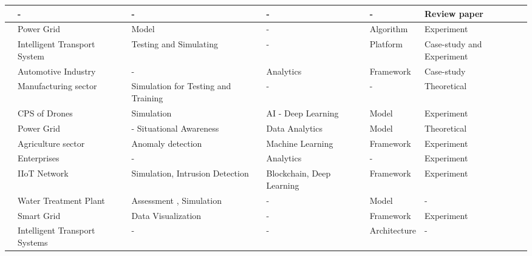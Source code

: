 \begin{table}[H]
\begin{NiceTabular}{p{0.5cm}|p{3cm}|p{2.5cm}|p{2cm}|p{3cm}|p{1.5cm}}
   \cite{rajivfaleiroDigitalTwinCybersecurity2022} & - & - & - & - & Review paper \\
   \hline

   \cite{hossenDigitalTwinSelfSecurity2021} & Power Grid & Model & - & Algorithm & Experiment \\
   \hline

   \cite{luongnguyenDigitalTwinIoT2022} & Intelligent Transport System & Testing and Simulating & - & Platform & Case-study and Experiment \\
    \hline

    \cite{almeaibedDigitalTwinAnalysis2021} & Automotive Industry & - & Analytics & Framework & Case-study \\
    \hline

    \cite{becueCyberFactorySecuringIndustry40with2018} & Manufacturing sector & Simulation for Testing and Training & - & - & Theoretical \\ 
    \hline

    \cite{wuDeepLearningDriven2022} & CPS of Drones & Simulation & AI - Deep Learning & Model & Experiment \\
    \hline

    \cite{salviCyberresilienceCriticalCyber2022} & Power Grid & - Situational Awareness & Data Analytics & Model & Theoretical \\
    \hline

    \cite{chukkapalliCyberPhysicalSystemSecurity2021} & Agriculture sector & Anomaly detection & Machine Learning & Framework & Experiment \\
    \hline

    \cite{hadarCyberDigitalTwin2020} & Enterprises & - & Analytics & - & Experiment \\
    \hline

    \cite{kumarBlockchainDeepLearning2022} & IIoT Network & Simulation, Intrusion Detection & Blockchain, Deep Learning & Framework & Experiment \\
    \hline

    \cite{sugumarAssessmentMethodDetecting2019} & Water Treatment Plant & Assessment , Simulation & - & Model & - \\
    \hline

    \cite{williamdanilczykANGELIntelligentDigital2019} & Smart Grid & Data Visualization & - & Framework & Experiment \\
    \hline

    \cite{masiSecuringCriticalInfrastructures2023} & Intelligent Transport Systems & - & - & Architecture & - \\
    \hline


\end{NiceTabular}
\end{table}
